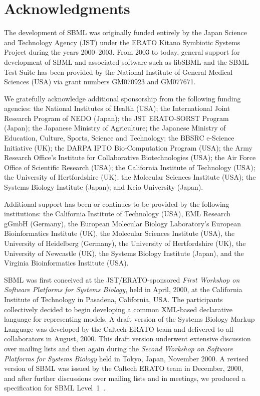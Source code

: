 
\section{Acknowledgments}
\label{sec:acknowledgements}
\label{sec:acknowledgments}

The development of SBML was originally funded entirely by the
Japan Science and Technology Agency (JST) under the ERATO Kitano
Symbiotic Systems Project during the years 2000--2003.  From 2003
to today, general support for development of SBML and associated
software such as libSBML and the SBML Test Suite has been provided
by the National Institute of General Medical Sciences (USA) via
grant numbers GM070923 and GM077671.

We gratefully acknowledge additional sponsorship from the
following funding agencies: the National Institutes of Health
(USA); the International Joint Research Program of NEDO (Japan);
the JST ERATO-SORST Program (Japan); the Japanese Ministry of
Agriculture; the Japanese Ministry of Education, Culture, Sports,
Science and Technology; the BBSRC e-Science Initiative (UK); the
DARPA IPTO Bio-Computation Program (USA); the Army Research
Office's Institute for Collaborative Biotechnologies (USA); the
Air Force Office of Scientific Research (USA); the California
Institute of Technology (USA); the University of Hertfordshire
(UK); the Molecular Sciences Institute (USA); the Systems Biology
Institute (Japan); and Keio University (Japan).

Additional support has been or continues to be provided by the
following institutions: the California Institute of Technology
(USA), EML Research gGmbH (Germany), the European Molecular
Biology Laboratory's European Bioinformatics Institute (UK), the
Molecular Sciences Institute (USA), the University of Heidelberg
(Germany), the University of Hertfordshire (UK), the University of
Newcastle (UK), the Systems Biology Institute (Japan), and the
Virginia Bioinformatics Institute (USA).

SBML was first conceived at the JST/ERATO-sponsored \emph{First
  Workshop on Software Platforms for Systems Biology}, held in
April, 2000, at the California Institute of Technology in
Pasadena, California, USA.  The participants collectively decided
to begin developing a common XML-based declarative language for
representing models.  A draft version of the Systems Biology
Markup Language was developed by the Caltech ERATO team and
delivered to all collaborators in August, 2000.  This draft
version underwent extensive discussion over mailing lists and then
again during the \emph{Second Workshop on Software Platforms for
  Systems Biology} held in Tokyo, Japan, November 2000.  A revised
version of SBML was issued by the Caltech ERATO team in December,
2000, and after further discussions over mailing lists and in
meetings, we produced a specification for SBML
Level~1~\citep{hucka:2001}.

